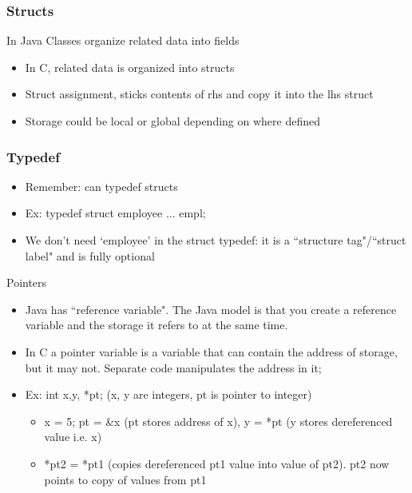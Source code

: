 \subsubsection{Structs}
In Java Classes organize related data into fields
\begin{itemize}
    \item In C, related data is organized into structs
    \item Struct assignment, sticks contents of rhs and copy it into the lhs struct
    \item Storage could be local or global depending on where defined
\end{itemize}

\subsubsection{Typedef}
\begin{itemize}
    \item Remember: can typedef structs
    \item Ex: typedef struct employee { ... } empl;
    \item We don't need `employee' in the struct typedef: it is a ``structure tag"/``struct label" and is fully optional
\end{itemize}
Pointers
\begin{itemize}
    \item Java has ``reference variable". The Java model is that you create a reference variable and the storage it refers to at the same time.
    \item In C a pointer variable is a variable that can contain the address of storage, but it may not. Separate code manipulates the address in it;
    \item Ex: int x,y, *pt; (x, y are integers, pt is pointer to integer)
    \begin{itemize}
        \item x = 5; pt = \&x (pt stores address of x), y = *pt (y stores dereferenced value i.e. x)
        \item *pt2 = *pt1 (copies dereferenced pt1 value into value of pt2). pt2 now points to copy of values from pt1
    \end{itemize}
\end{itemize}

